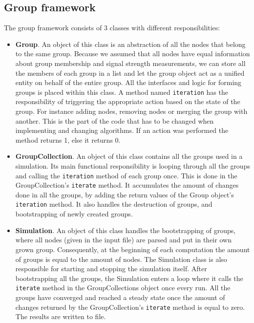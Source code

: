 \subsection{Group framework}
The group framework consists of 3 classes with different responsibilities:
\begin{itemize}
	\item \textbf{Group}. An object of this class is an abstraction of all the nodes that belong to the same group. Because we assumed that all nodes have equal
	information about group membership and signal strength measurements, we can store all the members of each group in a list and let the group object act as a unified entity on
	behalf of the entire group. All the interfaces and logic for forming groups is placed within this class. A method named \verb|iteration|
	has the responsibility of triggering the appropriate action based on the state of the group. For instance adding nodes, removing nodes or merging the group
	with another. This is the part of the code that has to be changed when implementing and changing algorithms. If an action was performed the method returns 1, else it returns 0. 

	\item \textbf{GroupCollection}. An object of this class contains all the groups used in a simulation. Its main functional responsibility is looping through all the groups
	and calling the \verb|iteration| method of each group once. This is done in the GroupCollection's \verb|iterate| method. It accumulates the amount of changes done in all the groups,
	by adding the return values of the Group object's \verb|iteration| method. It also handles the destruction of groups, and bootstrapping of newly created groups.

	\item \textbf{Simulation}. An object of this class handles the bootstrapping of groups, where all nodes (given in the input file) are parsed and
	put in their own grown group. Consequently, at the beginning of each computation the amount of groups is equal to the amount of nodes.
	The Simulation class is also responsible for starting and stopping the simulation itself. After bootstrapping all the groups, the Simulation enters a loop
	where it calls the \verb|iterate| method in the GroupCollections object once every run. All the groups have converged and reached a steady state 
	once the amount of changes returned by the GroupCollection's \verb|iterate| method is equal to zero. The results are written to file.
\end{itemize}

